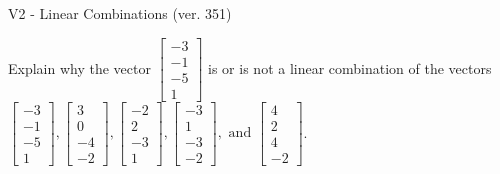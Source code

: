 \begin{exercise}
  \begin{exerciseTitle}V2 - Linear Combinations (ver. 351)\end{exerciseTitle}
  \begin{exerciseStatement}
    Explain why the vector \(\left[\begin{array}{c}
-3 \\
-1 \\
-5 \\
1
\end{array}\right]\)  is or is not a linear 
	combination of the vectors \(\left[\begin{array}{c}
-3 \\
-1 \\
-5 \\
1
\end{array}\right] , \left[\begin{array}{c}
3 \\
0 \\
-4 \\
-2
\end{array}\right] , \left[\begin{array}{c}
-2 \\
2 \\
-3 \\
1
\end{array}\right] , \left[\begin{array}{c}
-3 \\
1 \\
-3 \\
-2
\end{array}\right] , \text{ and } \left[\begin{array}{c}
4 \\
2 \\
4 \\
-2
\end{array}\right]\).
	



\end{exerciseStatement}
\end{exercise}
